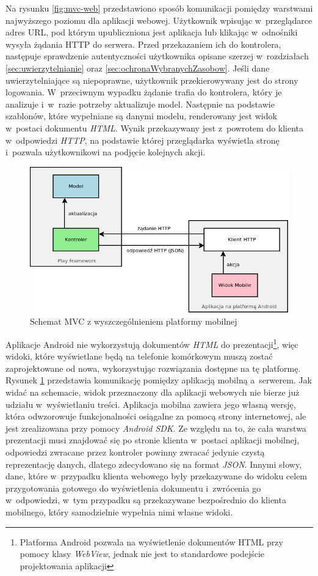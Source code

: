 \documentclass[11pt]{aghdpl}
\begin{document}
Na rysunku \ref{fig:mvc-web} przedstawiono sposób komunikacji pomiędzy warstwami najwyższego poziomu dla aplikacji webowej. Użytkownik wpisując w~przeglądarce adres URL, pod którym upubliczniona jest aplikacja lub klikając w~odnośniki wysyła żądania HTTP do serwera. Przed przekazaniem ich do kontrolera, następuje sprawdzenie autentyczności użytkownika opisane szerzej w~rozdziałach \ref{sec:uwierzytelnianie} oraz \ref{sec:ochronaWybranychZasobow}. Jeśli dane uwierzytelniające są niepoprawne, użytkownik przekierowywany jest do strony logowania. W~przeciwnym wypadku żądanie trafia do kontrolera, który je analizuje i~w~razie potrzeby aktualizuje model. Następnie na podstawie szablonów, które wypełniane są danymi modelu, renderowany jest widok w~postaci dokumentu \emph{HTML}. Wynik przekazywany jest z~powrotem do klienta w~odpowiedzi \emph{HTTP}, na podstawie której przeglądarka wyświetla stronę i~pozwala użytkownikowi na podjęcie kolejnych akcji.

\begin{figure}[h!]
	\centering
	\includegraphics[width=\linewidth * 4/5]{MVC-MOBILE}
	\caption{Schemat MVC z wyszczególnieniem platformy mobilnej}
	\label{fig:mvc-mobile}
\end{figure}

Aplikacje Android nie wykorzystują dokumentów \emph{HTML} do prezentacji\footnote{Platforma Android pozwala na wyświetlenie dokumentów HTML przy pomocy klasy \emph{WebView}, jednak nie jest to standardowe podejście projektowania aplikacji}, więc widoki, które wyświetlane będą na telefonie komórkowym muszą zostać zaprojektowane od nowa, wykorzystując rozwiązania dostępne na tę platformę. Rysunek \ref{fig:mvc-mobile} przedstawia komunikację pomiędzy aplikacją mobilną a~serwerem. Jak widać na schemacie, widok przeznaczony dla aplikacji webowych nie bierze już udziału w~wyświetlaniu treści. Aplikacja mobilna zawiera jego własną wersję, która odwzorowuje funkcjonalności osiągalne za pomocą strony internetowej, ale jest zrealizowana przy pomocy \emph{Android SDK}. Ze względu na to, że cała warstwa prezentacji musi znajdować się po stronie klienta w~postaci aplikacji mobilnej, odpowiedzi zwracane przez kontroler powinny zwracać jedynie czystą reprezentację danych, dlatego zdecydowano się na format \emph{JSON}. Innymi słowy, dane, które w~przypadku klienta webowego były przekazywane do widoku celem przygotowania gotowego do wyświetlenia dokumentu i~zwrócenia go w~odpowiedzi, w~tym przypadku są przekazywane bezpośrednio do klienta mobilnego, który samodzielnie wypełnia nimi własne widoki.
\end{document}
